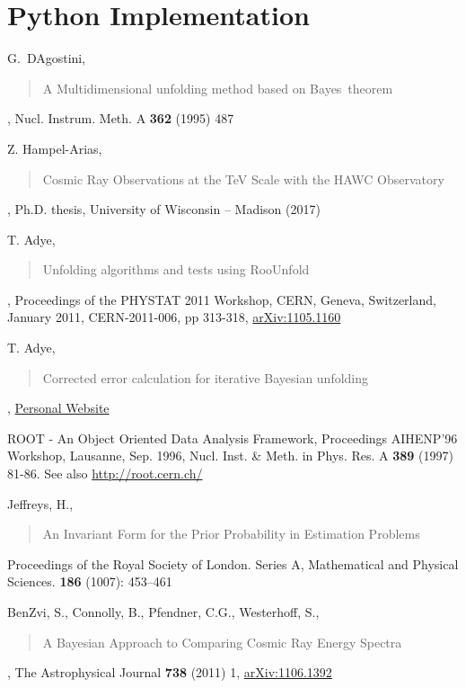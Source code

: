 \documentclass[11pt, letter]{article}
\begin{document}
\section{Python Implementation}\label{python_code_section}

\newpage

\begin{thebibliography}{99}

 G.~D\textquotesingle Agostini, \blockquote{A Multidimensional unfolding method based on Bayes\textquotesingle \ theorem}, 
Nucl. Instrum. Meth. A {\bf 362} (1995) 487

 Z. Hampel-Arias, \blockquote{Cosmic Ray Observations at the TeV Scale with the HAWC Observatory},
Ph.D. thesis, University of Wisconsin -- Madison (2017)

 T. Adye, \blockquote{Unfolding algorithms and tests using RooUnfold}, Proceedings of the PHYSTAT 2011 Workshop, CERN, Geneva, 
Switzerland, January 2011, CERN-2011-006, pp 313-318, \href{http://arxiv.org/abs/1105.1160v1}{arXiv:1105.1160}

 T. Adye, \blockquote{Corrected error calculation for iterative Bayesian unfolding}, 
\href{http://hepunx.rl.ac.uk/~adye/software/unfold/bayes_errors.pdf}{Personal Website}

 ROOT - An Object Oriented Data Analysis Framework, Proceedings AIHENP'96 Workshop, Lausanne, Sep. 1996, Nucl. 
Inst. \& Meth. in Phys. Res. A {\bf 389} (1997) 81-86. See also \href{http://root.cern.ch/}{http://root.cern.ch/}

 Jeffreys, H., \blockquote{An Invariant Form for the Prior Probability in Estimation Problems}. 
Proceedings of the Royal Society of London. Series A, Mathematical and Physical Sciences. {\bf 186} (1007): 453–461

 BenZvi, S., Connolly, B., Pfendner, C.G., Westerhoff, S., \blockquote{A Bayesian Approach to Comparing Cosmic Ray Energy Spectra}, 
The Astrophysical Journal {\bf 738} (2011) 1, \href{https://arxiv.org/abs/1106.1392}{arXiv:1106.1392}

\end{thebibliography}
\end{document}
